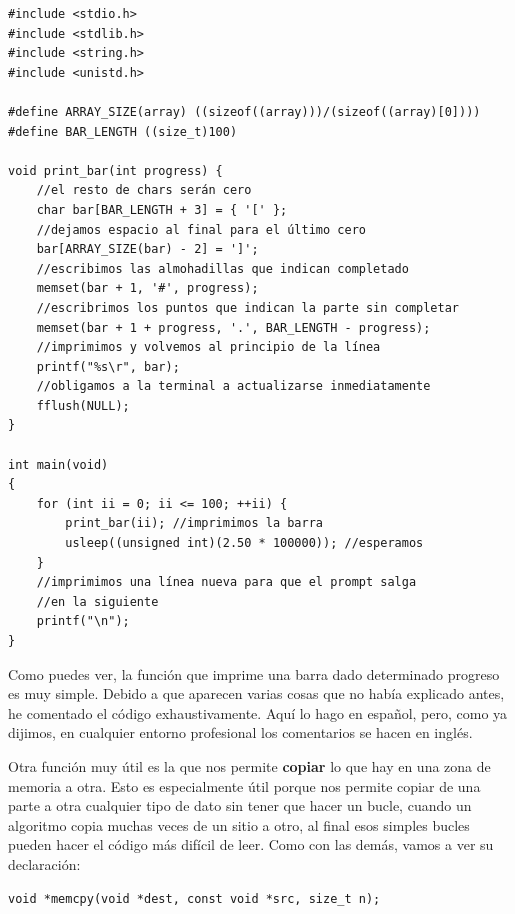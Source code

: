\documentclass[a4paper]{article}
\begin{document}
\noindent
\begin{minipage}[H]{\linewidth}
\mbox{}
\begin{lstlisting}[style=C,
caption={Utilización de la función \texttt{memset}},
label={lst:memsetExample}]
#include <stdio.h>
#include <stdlib.h>
#include <string.h>
#include <unistd.h>

#define ARRAY_SIZE(array) ((sizeof((array)))/(sizeof((array)[0])))
#define BAR_LENGTH ((size_t)100)

void print_bar(int progress) {
    //el resto de chars serán cero
    char bar[BAR_LENGTH + 3] = { '[' };
    //dejamos espacio al final para el último cero
    bar[ARRAY_SIZE(bar) - 2] = ']';
    //escribimos las almohadillas que indican completado
    memset(bar + 1, '#', progress);
    //escribrimos los puntos que indican la parte sin completar
    memset(bar + 1 + progress, '.', BAR_LENGTH - progress);
    //imprimimos y volvemos al principio de la línea
    printf("%s\r", bar);
    //obligamos a la terminal a actualizarse inmediatamente
    fflush(NULL);
}

int main(void)
{
    for (int ii = 0; ii <= 100; ++ii) {
        print_bar(ii); //imprimimos la barra
        usleep((unsigned int)(2.50 * 100000)); //esperamos
    }
    //imprimimos una línea nueva para que el prompt salga
    //en la siguiente
    printf("\n");
}
\end{lstlisting}
\end{minipage}

Como puedes ver, la función que imprime una barra dado determinado progreso
es muy simple. Debido a que aparecen varias cosas que no había explicado antes,
he comentado el código exhaustivamente. Aquí lo hago en español, pero, como
ya dijimos, en cualquier entorno profesional los comentarios se hacen en inglés.

Otra función muy útil es la que nos permite \textbf{copiar} lo que hay en una
zona de memoria a otra. Esto es especialmente útil porque nos permite copiar
de una parte a otra cualquier tipo de dato sin tener que hacer un bucle, cuando
un algoritmo copia muchas veces de un sitio a otro, al final esos simples
bucles pueden hacer el código más difícil de leer. Como con las demás, vamos
a ver su declaración:


\noindent
\begin{minipage}[H]{\linewidth}
\mbox{}
\begin{lstlisting}[style=C,
caption={Declaración de \texttt{memcpy}},
label={lst:memcpy}]
void *memcpy(void *dest, const void *src, size_t n);
\end{lstlisting}
\end{minipage}
\end{document}
